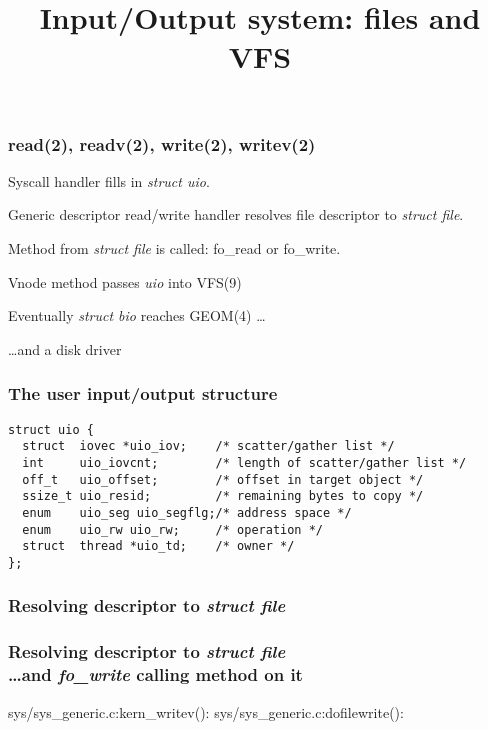 \documentclass{beamer}
\title{Input/Output system: files and VFS}
\begin{document}
\begin{frame}
\titlepage
\end{frame}


\begin{frame}
\frametitle{read(2), readv(2), write(2), writev(2)}
\begin{itemize}
 {
  \item {Syscall handler fills in \emph{struct uio}.}
}
 {
  \item {Generic descriptor read/write handler 
	 resolves file descriptor to \emph{struct file}.}
  \item {Method from \emph{struct file} is called: fo\_read or fo\_write.}
}
 {
  \item {Vnode method passes \emph{uio} into VFS(9)}
}
 {
  \item {Eventually \emph{struct bio} reaches GEOM(4) \ldots}
  \item {\ldots and a disk driver}
}
\end{itemize}
\end{frame}


\begin{frame}[fragile]
\frametitle{The user input/output structure}
\begin{verbatim}
struct uio {
  struct  iovec *uio_iov;    /* scatter/gather list */
  int     uio_iovcnt;        /* length of scatter/gather list */
  off_t   uio_offset;        /* offset in target object */
  ssize_t uio_resid;         /* remaining bytes to copy */
  enum    uio_seg uio_segflg;/* address space */
  enum    uio_rw uio_rw;     /* operation */
  struct  thread *uio_td;    /* owner */
};
\end{verbatim}
\end{frame}


\begin{frame}
 {
  \frametitle{Resolving descriptor to \emph{struct file}}
}
 {
  \frametitle{Resolving descriptor to \emph{struct file}\\
	      \ldots and \emph{fo\_write} calling method on it}
}
 {
  sys/sys\_generic.c:kern\_writev():
}
 {
  sys/sys\_generic.c:dofilewrite():
}
\end{frame}
\end{document}
